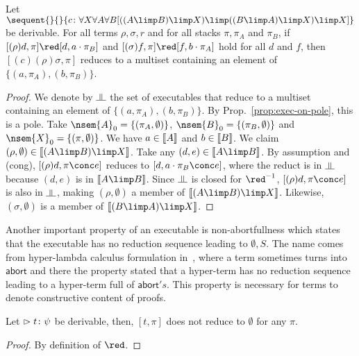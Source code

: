 \begin{proposition}
 \label{prop:spec}
 Let
 $\sequent{}{}{\tj c
 {\forall X\forall A\forall B
 [((A\limp B)\limp X)
  \limp((B\limp A)\limp X)
  \limp X]}}$
 be
 derivable.
 For all terms $\rho,\sigma, r$ and for all stacks $\pi, \pi_A$ and
 $\pi_B$,
 if $[(\rho)d  ,\pi]\red [d,a\cdot \pi_B]$ and
    $[(\sigma)f,\pi]\red [f,b\cdot \pi_A]$ hold for all $d$ and $f$,
 then
 $[(c)(\rho)\sigma,\pi]$ reduces to a multiset containing an
 element of
 $\{(a,\pi_A),(b,\pi_B)\}$.
\end{proposition}
\begin{proof}
 We denote by $\bbot$ the set of executables that reduce to a multiset
 containing an element of $\{(a,\pi_A), (b,\pi_B)\}$.
 By Prop.~\ref{prop:exec-on-pole},
 this is a pole.
 Take $\nsem{A}_0 =\{(\pi_A,\emptyset)\}$, $\nsem{B}_0 =
 \{(\pi_B,\emptyset)\}$ and $\nsem{X}_0=\{(\pi,\emptyset)\}$.
 We have $a\in\llbracket{A}\rrbracket$ and $b\in\llbracket{B}\rrbracket$.
 We claim $(\rho,\emptyset)\in\sem{(A\limp B)\limp X}$.
 Take any $(d,e)\in\sem{A\limp B}$.
 By assumption and (cong),
 $[(\rho)d,\pi\conc e]$ reduces to $[d,a\cdot\pi_B\conc e]$,
 where the reduct is in $\bbot$ because $(d,e)$ is in $\sem{A\limp B}$.
 Since $\bbot$ is closed for $\rev\red$,
 $[(\rho)d,\pi\conc e]$ is also in $\bbot$, making
 $(\rho,\emptyset)$ a member of $\sem{(A\limp B)\limp X}$.
 Likewise,
 $(\sigma,\emptyset)$ is a member of $\sem{(B\limp A)\limp X}$.
\end{proof}


Another important property of an executable is
non-abortfullness
which states that the executable has no reduction sequence leading to
$\emptyset,S$.
The name comes from hyper-lambda calculus formulation in~\citep{hiraiflops2012},
where a term sometimes turns into $\mathsf{abort}$ and there the property
stated that a hyper-term has no reduction sequence leading to a hyper-term
full of $\mathsf{abort}'s$.
This property is necessary for terms to denote
constructive content of proofs.

\begin{proposition}
 Let $\vartriangleright{t} \colon{\psi}$ be derivable, then,
 $[t,\pi]$ does not reduce to $\emptyset$ for
 any $\pi$.
\end{proposition}
\begin{proof}
 By definition of $\red$.
\end{proof}

